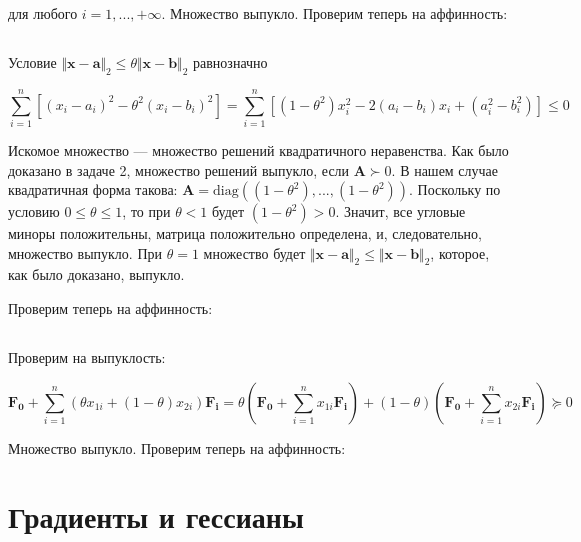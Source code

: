 	для любого $i=1,...,+\infty$. Множество выпукло. Проверим теперь на аффинность:
	
	\subsection{}
	
	Условие $\Vert \mathbf{x} - \mathbf{a} \Vert_2 \leqslant \theta \Vert \mathbf{x} - \mathbf{b} \Vert_2$ равнозначно
	
	\begin{equation}
	\sum\limits_{i=1}^{n}\left[ (x_i - a_i)^2 - \theta^2 (x_i-b_i)^2 \right] = \sum\limits_{i=1}^{n}\left[(1-\theta^2)x_i^2 - 2(a_i-b_i)x_i + (a_i^2-b_i^2) \right] \leqslant 0
	\end{equation}
	
	Искомое множество --- множество решений квадратичного неравенства. Как было доказано в задаче 2, множество решений выпукло, если $\mathbf{A} \succ 0$. В нашем случае квадратичная форма такова: $\mathbf{A} = \text{diag}((1-\theta^2), ..., (1-\theta^2))$. Поскольку по условию $0 \leqslant \theta \leqslant 1$, то при $\theta < 1$ будет $(1-\theta^2) > 0$. Значит, все угловые миноры положительны, матрица положительно определена, и, следовательно, множество выпукло. При $\theta = 1$ множество будет $\Vert \mathbf{x} - \mathbf{a} \Vert_2 \leqslant  \Vert \mathbf{x} - \mathbf{b} \Vert_2$, которое, как было доказано, выпукло.
	
	Проверим теперь на аффинность:
	
	\subsection{}
	
	Проверим на выпуклость:
	
	\begin{equation}
	\mathbf{F_0} + \sum\limits_{i=1}^{n}(\theta x_{1i} + (1-\theta) x_{2i} )\mathbf{F_i} = \theta(\mathbf{F_0} + \sum\limits_{i=1}^{n} x_{1i}\mathbf{F_i}) + (1-\theta)(\mathbf{F_0} + \sum\limits_{i=1}^{n} x_{2i} \mathbf{F_i}) \succeq 0
	\end{equation}
	
	Множество выпукло. Проверим теперь на аффинность:
	
	\section{Градиенты и гессианы}
	
	\subsection{}
	
